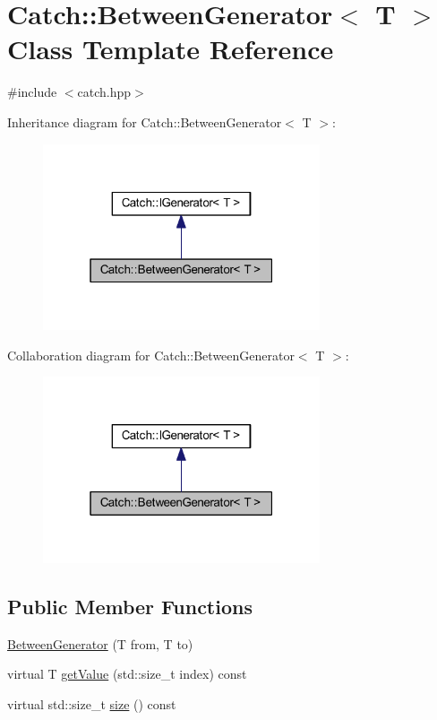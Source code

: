 \hypertarget{class_catch_1_1_between_generator}{}\section{Catch\+:\+:Between\+Generator$<$ T $>$ Class Template Reference}
\label{class_catch_1_1_between_generator}


{\ttfamily \#include $<$catch.\+hpp$>$}



Inheritance diagram for Catch\+:\+:Between\+Generator$<$ T $>$\+:\nopagebreak
\begin{figure}[H]
\begin{center}
\leavevmode
\includegraphics[width=232pt]{class_catch_1_1_between_generator__inherit__graph}
\end{center}
\end{figure}


Collaboration diagram for Catch\+:\+:Between\+Generator$<$ T $>$\+:\nopagebreak
\begin{figure}[H]
\begin{center}
\leavevmode
\includegraphics[width=232pt]{class_catch_1_1_between_generator__coll__graph}
\end{center}
\end{figure}
\subsection*{Public Member Functions}
\begin{DoxyCompactItemize}
\item 
\hyperlink{class_catch_1_1_between_generator_a835a057d691ae37caef660624099b51c}{Between\+Generator} (T from, T to)
\item 
virtual T \hyperlink{class_catch_1_1_between_generator_a913f74bb0c23b3bc0127abfffdabbd94}{get\+Value} (std\+::size\+\_\+t index) const
\item 
virtual std\+::size\+\_\+t \hyperlink{class_catch_1_1_between_generator_af65a1fe51f9b1106fc676e3dd189adb6}{size} () const
\end{DoxyCompactItemize}


